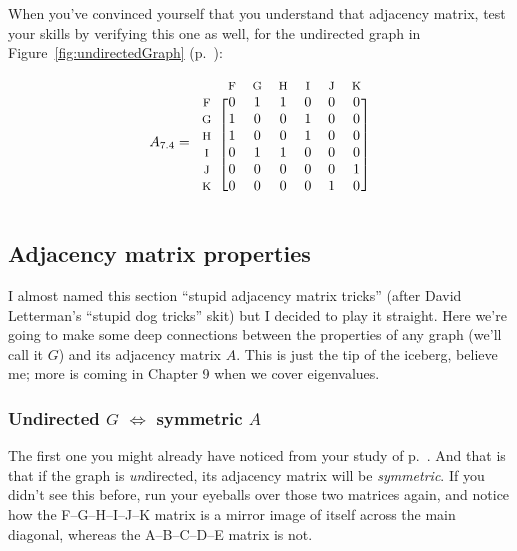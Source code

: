 \begin{alttitles}
When you've convinced yourself that you understand that adjacency matrix, test
your skills by verifying this one as well, for the undirected graph in 
Figure~\ref{fig:undirectedGraph} (p.~\pageref{fig:undirectedGraph}):

\[
A_{7.4} = 
\begin{blockarray}{ccccccc}
& {\footnotesize\textrm{F}} & {\footnotesize\textrm{G}} & {\footnotesize\textrm{H}} & {\footnotesize\textrm{I}} & {\footnotesize\textrm{J}} & {\footnotesize\textrm{K}} \\
\begin{block}{c[cccccc]}
{\footnotesize\textrm{F}} & 0 & 1 & 1 & 0 & 0 & 0 \\
{\footnotesize\textrm{G}} & 1 & 0 & 0 & 1 & 0 & 0 \\
{\footnotesize\textrm{H}} & 1 & 0 & 0 & 1 & 0 & 0 \\
{\footnotesize\textrm{I}} & 0 & 1 & 1 & 0 & 0 & 0 \\
{\footnotesize\textrm{J}} & 0 & 0 & 0 & 0 & 0 & 1 \\
{\footnotesize\textrm{K}} & 0 & 0 & 0 & 0 & 1 & 0 \\
\end{block}
\end{blockarray}
\]


\subsection{Adjacency matrix properties}


I almost named this section ``stupid adjacency matrix tricks'' (after David
Letterman's ``stupid dog tricks'' skit) but I decided to play it straight.
Here we're going to make some deep connections between the properties of any
graph (we'll call it $G$) and its adjacency matrix $A$. This is just the tip of
the iceberg, believe me; more is coming in Chapter 9 when we cover eigenvalues.

\subsubsection{Undirected $G$ $\Leftrightarrow$ symmetric $A$}


The first one you might already have noticed from your study of
p.~\pageref{firstAdjacencyMatrix}. And that is that if the graph is
\textit{un}directed, its adjacency matrix will be \textit{symmetric}. If you
didn't see this before, run your eyeballs over those two matrices again, and
notice how the F--G--H--I--J--K matrix is a mirror image of itself across the
main diagonal, whereas the A--B--C--D--E matrix is not.


\end{alttitles}
